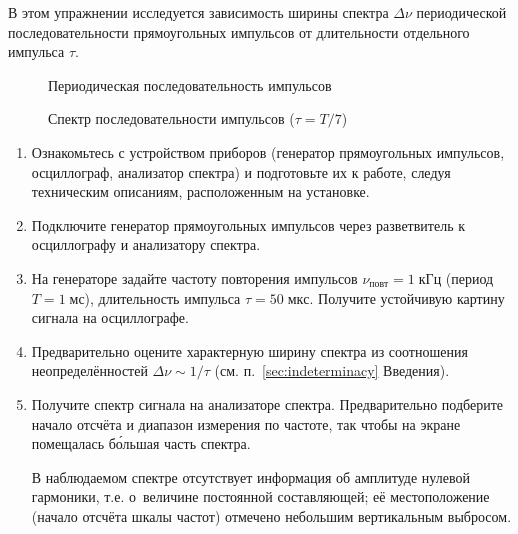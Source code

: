 \begin{lab:task}


В этом упражнении исследуется зависимость ширины спектра $\Delta \nu$
периодической последовательности прямоугольных импульсов
от длительности отдельного импульса $\tau$.

\begin{figure}[h!]
\hfil\hfil
\begin{minipage}{0.4\textwidth}
    \caption{Периодическая последовательность импульсов}
\end{minipage}
\hfil
\begin{minipage}{0.4\textwidth}
    \caption{Спектр последовательности импульсов ($\tau=T/7$)}
\end{minipage}
\end{figure}


\begin{enumerate}

\item Ознакомьтесь с устройством приборов (генератор прямоугольных импульсов,
осциллограф, анализатор спектра) и подготовьте их к работе,
следуя техническим описаниям, расположенным на установке.

\item Подключите генератор прямоугольных импульсов через разветвитель
к осциллографу и анализатору спектра.

\item На генераторе задайте частоту повторения импульсов
$\nu_{повт} = 1\;кГц$ (период $T=1\;мс$), длительность импульса
$\tau=50\;мкс$. Получите устойчивую картину сигнала на осциллографе.

\item Предварительно оцените характерную ширину спектра
из соотношения неопределённостей $\Delta \nu \sim 1/\tau$
(см.  п.~\ref{sec:indeterminacy} Введения).

\item Получите спектр сигнала на анализаторе спектра. Предварительно
подберите начало отсчёта и диапазон измерения по частоте,
так чтобы на экране помещалась б\'{о}льшая часть спектра.

В наблюдаемом спектре отсутствует информация об амплитуде нулевой гармоники,
т.е. о~величине постоянной составляющей; её местоположение (начало отсчёта шкалы
частот) отмечено небольшим вертикальным выбросом.


\end{enumerate}
\end{lab:task}
